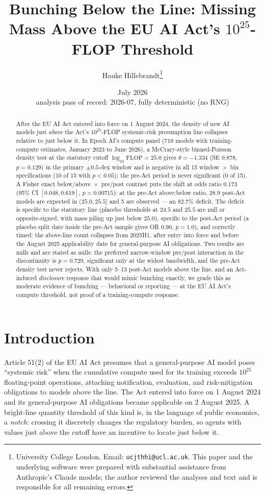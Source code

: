 \documentclass[11pt]{article}
\title{Bunching Below the Line: Missing Mass Above the EU AI Act's
$10^{25}$-FLOP Threshold}
\author{Hauke Hillebrandt\thanks{University College London. Email:
\texttt{ucjthhi@ucl.ac.uk}. This paper and the underlying \natex{} software were
prepared with substantial assistance from Anthropic's Claude models; the author
reviewed the analyses and text and is responsible for all remaining errors.}}
\date{July 2026 \\ \small analysis pass of record: 2026-07, fully
deterministic (no RNG)}
\begin{document}
\maketitle

\begin{abstract}
\noindent After the EU AI Act entered into force on 1 August 2024, the density
of new AI models just \emph{above} the Act's $10^{25}$-FLOP systemic-risk
presumption line collapses relative to just below it. In Epoch AI's compute
panel (719 models with training-compute estimates, January 2023 to June 2026),
a McCrary-style binned-Poisson density test at the statutory cutoff
$\log_{10}\mathrm{FLOP}=25.0$ gives $\theta=-1.334$ (SE $0.878$, $p=0.129$) in
the primary $\pm 0.5$-dex window and is negative in all 15 window~$\times$~bin
specifications (10 of 15 with $p<0.05$); the pre-Act period is never
significant (0 of 15). A Fisher exact below/above~$\times$~pre/post contrast
puts the shift at odds ratio $0.173$ (95\% CI $[0.048, 0.619]$, $p=0.00715$):
at the pre-Act above:below ratio, $28.9$ post-Act models are expected in
$(25.0, 25.5]$ and 5 are observed --- an $82.7\%$ deficit. The deficit is
specific to the statutory line (placebo thresholds at $24.5$ and $25.5$ are
null or opposite-signed, with mass piling up just below $25.0$), specific to
the post-Act period (a placebo split date inside the pre-Act sample gives
OR $0.90$, $p=1.0$), and correctly timed: the above-line count collapses from
2025H1, after entry into force and before the August 2025 applicability date
for general-purpose AI obligations. Two results are nulls and are stated as
nulls: the preferred narrow-window pre/post interaction in the discontinuity
is $p=0.729$, significant only at the widest bandwidth, and the pre-Act
density test never rejects. With only 5--13 post-Act models above the line,
and an Act-induced \emph{disclosure} response that would mimic bunching
exactly, we grade this as moderate evidence of bunching --- behavioral or
reporting --- at the EU AI Act's compute threshold, not proof of a
training-compute response.
\end{abstract}

\section{Introduction}\label{sec:intro}

Article 51(2) of the EU AI Act \cite{euaiact2024} presumes that a
general-purpose AI model poses ``systemic risk'' when the cumulative compute
used for its training exceeds $10^{25}$ floating-point operations, attaching
notification, evaluation, and risk-mitigation obligations to models above the
line. The Act entered into force on 1 August 2024 and its general-purpose AI
obligations became applicable on 2 August 2025. A bright-line quantity
threshold of this kind is, in the language of public economics, a
\emph{notch}: crossing it discretely changes the regulatory burden, so agents
with values just above the cutoff have an incentive to locate just below it.
\end{document}
